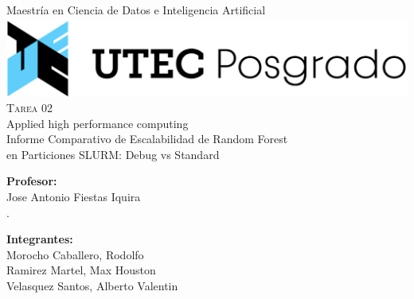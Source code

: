\documentclass{article}
\begin{document}
\begin{titlepage}
		
		\begin{center}
			
			{\Large { Maestría en Ciencia de Datos e Inteligencia Artificial} }\\[1cm]
			\includegraphics[scale=0.15]{logo.png}
			\\[1cm]
			{\Huge \textsc{Tarea 02}}\\[0.7cm]
			{\Huge Applied high performance computing}\\[1cm]
			{\Large Informe Comparativo de Escalabilidad de Random Forest\\en Particiones SLURM: Debug vs Standard}\\[2cm]
			
			\begin{minipage}[l]{0.4\textwidth}
				\begin{flushleft}
					\textbf{\textsf{Profesor:}}\\
					\large Jose Antonio Fiestas Iquira\\ 
					\linespread{4}
					\large .\\ 
				\end{flushleft}
			\end{minipage}
			\begin{minipage}[l]{0.4\textwidth}
				
				\begin{flushright}
					\textbf{\textsf{Integrantes:}}\\
					\linespread{1}
					\large Morocho Caballero, Rodolfo\\
					\large Ramirez Martel, Max Houston\\
                    \large Velasquez Santos, Alberto Valentin\\
				\end{flushright}
                \date{\today}
			\end{minipage}
			
		\end{center}
        \end{titlepage}
\newpage                
        
\end{document}
